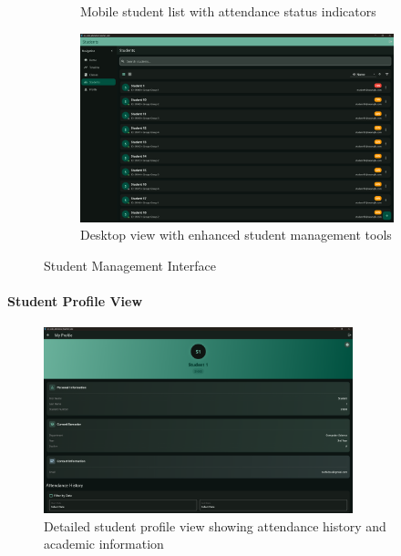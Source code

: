 \begin{figure}[H]
\begin{subfigure}[b]{0.48\textwidth}
        \caption{Mobile student list with attendance status indicators}
    \end{subfigure}
    \hfill
    \begin{subfigure}[b]{0.48\textwidth}
        \includegraphics[width=\textwidth]{images/rachid/teacher-side-studentpage-desktop.png}
        \caption{Desktop view with enhanced student management tools}
    \end{subfigure}
    \caption{Student Management Interface}
    \label{fig:student-management}
\end{figure}

\paragraph{Student Profile View}
\vspace{1cm}
\begin{figure}[H]
    \centering
    \includegraphics[width=0.8\textwidth]{images/rachid/teacher-side-studentpage-profileOfStudent-desktop.png}
    \caption{Detailed student profile view showing attendance history and academic information}
    \label{fig:student-profile}
\end{figure}

